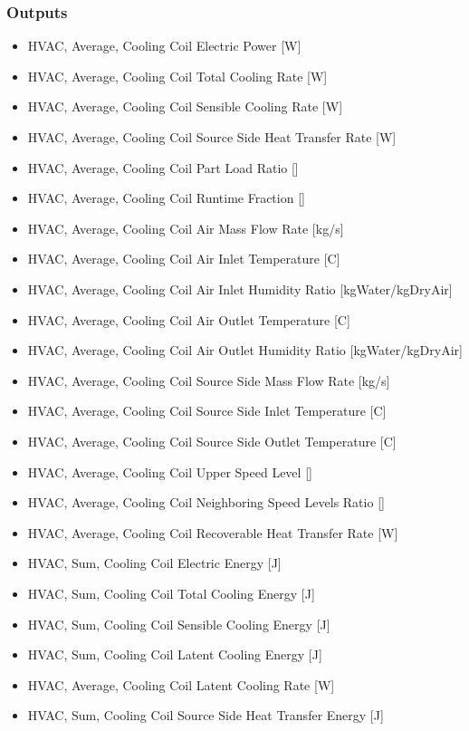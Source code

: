 \subsubsection{Outputs}\label{outputs-26}

\begin{itemize}
\item
  HVAC, Average, Cooling Coil Electric Power {[}W{]}
\item
  HVAC, Average, Cooling Coil Total Cooling Rate {[}W{]}
\item
  HVAC, Average, Cooling Coil Sensible Cooling Rate {[}W{]}
\item
  HVAC, Average, Cooling Coil Source Side Heat Transfer Rate {[}W{]}
\item
  HVAC, Average, Cooling Coil Part Load Ratio {[]}
\item
  HVAC, Average, Cooling Coil Runtime Fraction {[]}
\item
  HVAC, Average, Cooling Coil Air Mass Flow Rate {[}kg/s{]}
\item
  HVAC, Average, Cooling Coil Air Inlet Temperature {[}C{]}
\item
  HVAC, Average, Cooling Coil Air Inlet Humidity Ratio {[}kgWater/kgDryAir{]}
\item
  HVAC, Average, Cooling Coil Air Outlet Temperature {[}C{]}
\item
  HVAC, Average, Cooling Coil Air Outlet Humidity Ratio {[}kgWater/kgDryAir{]}
\item
  HVAC, Average, Cooling Coil Source Side Mass Flow Rate {[}kg/s{]}
\item
  HVAC, Average, Cooling Coil Source Side Inlet Temperature {[}C{]}
\item
  HVAC, Average, Cooling Coil Source Side Outlet Temperature {[}C{]}
\item
  HVAC, Average, Cooling Coil Upper Speed Level {[]}
\item
  HVAC, Average, Cooling Coil Neighboring Speed Levels Ratio {[]}
\item
  HVAC, Average, Cooling Coil Recoverable Heat Transfer Rate {[}W{]}
\item
  HVAC, Sum, Cooling Coil Electric Energy {[}J{]}
\item
  HVAC, Sum, Cooling Coil Total Cooling Energy {[}J{]}
\item
  HVAC, Sum, Cooling Coil Sensible Cooling Energy {[}J{]}
\item
  HVAC, Sum, Cooling Coil Latent Cooling Energy {[}J{]}
\item
  HVAC, Average, Cooling Coil Latent Cooling Rate {[}W{]}
\item
  HVAC, Sum, Cooling Coil Source Side Heat Transfer Energy {[}J{]}
\end{itemize}

